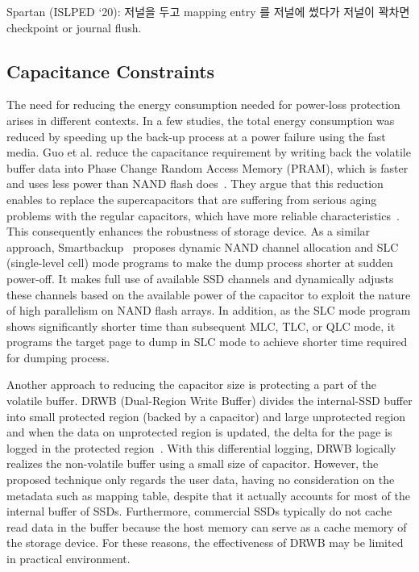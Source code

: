 Spartan (ISLPED ‘20): 저널을 두고 mapping entry 를 저널에 썼다가 저널이 꽉차면 checkpoint or journal flush. 
\fi


\subsection{Capacitance Constraints}
The need for reducing the energy consumption needed for power-loss protection
arises in different contexts. In a few studies, the total energy consumption
was reduced by speeding up the back-up process at a power failure using the fast media. Guo
et al. reduce the capacitance requirement by writing back the volatile buffer
data into Phase Change Random Access Memory (PRAM), which is faster and uses
less power than NAND flash does~\cite{GuoYZC13date}. They argue that this reduction
enables to replace the supercapacitors that are suffering from serious aging
problems with the regular capacitors, which have more reliable
characteristics~\cite{huang2011life}. This consequently enhances the robustness
of storage device.  As a similar approach, Smartbackup~\cite{HuangWQLS15hpcc}
proposes dynamic NAND channel allocation and SLC (single-level cell) mode
programs to make the dump process shorter at sudden power-off. It makes full
use of available SSD channels and dynamically adjusts these channels based on
the available power of the capacitor to exploit the nature of high parallelism
on NAND flash arrays.  In addition, as the SLC mode program shows significantly
shorter time than subsequent MLC, TLC, or QLC mode, it programs the target page
to dump in SLC mode to achieve shorter time required for dumping process.


Another approach to reducing the capacitor size is protecting a part of the 
volatile buffer. DRWB (Dual-Region Write Buffer) divides the internal-SSD
buffer into small protected region (backed by a capacitor) and large
unprotected region and when the data on unprotected region is updated, the 
delta for the page is logged in the protected region~\cite{KimK15sac}.  With
this differential logging, DRWB logically realizes the non-volatile buffer
using a small size of capacitor. However, the proposed technique only regards
the user data, having no consideration on the metadata such as mapping table, 
despite that it actually accounts for most of the internal buffer of SSDs.  Furthermore,
commercial SSDs typically do not cache read data in the buffer because the host
memory can serve as a cache memory of the storage device. For these reasons,
the effectiveness of DRWB may be limited in practical environment. 

